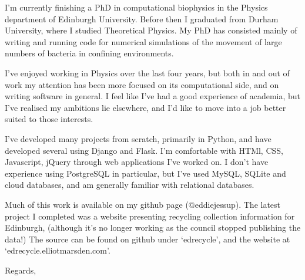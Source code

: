 \documentclass[10pt]{letter}
\begin{document}
    \begin{letter}{}

        I'm currently finishing a PhD in computational biophysics in the Physics department of Edinburgh University. Before then I graduated from Durham University, where I studied Theoretical Physics. My PhD has consisted mainly of writing and running code for numerical simulations of the movement of large numbers of bacteria in confining environments.

        I've enjoyed working in Physics over the last four years, but both in and out of work my attention has been more focused on its computational side, and on writing software in general. I feel like I've had a good experience of academia, but I've realised my ambitions lie elsewhere, and I'd like to move into a job better suited to those interests.

        I've developed many projects from scratch, primarily in Python, and have developed several using Django and Flask. I'm comfortable with HTMl, CSS, Javascript, jQuery through web applications I've worked on. I don't have experience using PostgreSQL in particular, but I've used MySQL, SQLite and cloud databases, and am generally familiar with relational databases.

        Much of this work is available on my github page (@eddiejessup). The latest project I completed was a website presenting recycling collection information for Edinburgh, (although it's no longer working as the council stopped publishing the data!) The source can be found on github under `edrecycle', and the website at `edrecycle.elliotmarsden.com'.

        \closing{Regards,}

    \end{letter}        
\end{document}

